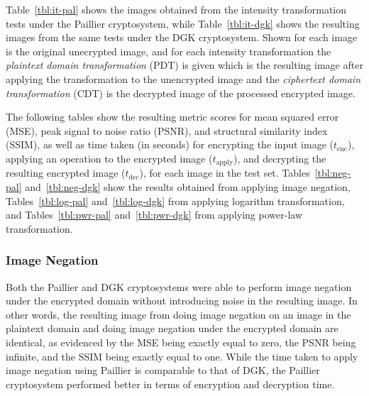 Table~\ref{tbl:it-pal} shows the images obtained from the intensity transformation tests under the Paillier cryptosystem, while Table~\ref{tbl:it-dgk} shows the resulting images from the same tests under the DGK cryptosystem. Shown for each image is the original unecrypted image, and for each intensity transformation the \textit{plaintext domain transformation} (PDT) is given which is the resulting image after applying the transformation to the unencrypted image and the \textit{ciphertext domain transformation} (CDT) is the decrypted image of the processed encrypted image.

The following tables show the resulting metric scores for mean squared error (MSE), peak signal to noise ratio (PSNR), and structural similarity index (SSIM), as well as time taken (in seconds) for encrypting the input image ($t_\text{enc}$), applying an operation to the encrypted image ($t_\text{apply}$), and decrypting the resulting encrypted image ($t_\text{dec}$), for each image in the test set. Tables~\ref{tbl:neg-pal} and~\ref{tbl:neg-dgk} show the results obtained from applying image negation, Tables~\ref{tbl:log-pal} and~\ref{tbl:log-dgk} from applying logarithm transformation, and Tables~\ref{tbl:pwr-pal} and~\ref{tbl:pwr-dgk} from applying power-law transformation.

\subsubsection{Image Negation}
Both the Paillier and DGK cryptosystems were able to perform image negation under the encrypted domain without introducing noise in the resulting image. In other words, the resulting image from doing image negation on an image in the plaintext domain and doing image negation under the encrypted domain are identical, as evidenced by the MSE being exactly equal to zero, the PSNR being infinite, and the SSIM being exactly equal to one. While the time taken to apply image negation using Paillier is comparable to that of DGK, the Paillier cryptosystem performed better in terms of encryption and decryption time.

